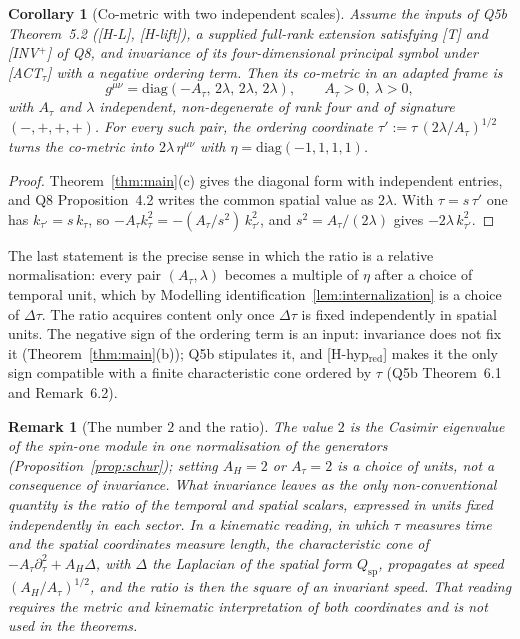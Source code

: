 \documentclass[12pt,a4paper]{article}
\newtheorem{corollary}[theorem]{Corollary}
\newtheorem{remark}[theorem]{Remark}
\newcommand{\Qsp}{Q_{\mathrm{sp}}}
\begin{document}
      \begin{corollary}[Co-metric with two independent scales]
        \label{cor:metric}
        Assume the inputs of Q5b Theorem~5.2 \textup{([H-L], [H-lift])}, a supplied full-rank extension satisfying
        \textup{[T]} and \textup{[INV$^+$]} of Q8, and invariance of its four-dimensional principal symbol under
        \textup{[ACT$_\tau$]} with a negative ordering term.
        Then its co-metric in an adapted frame is
        \[
          g^{\mu\nu} = \mathrm{diag}(-A_\tau,\, 2\lambda,\, 2\lambda,\, 2\lambda),
          \qquad A_\tau>0,\ \lambda>0,
        \]
        with $A_\tau$ and $\lambda$ independent, non-degenerate of rank four and of signature $(-,+,+,+)$.
        For every such pair, the ordering coordinate $\tau' := \tau\,(2\lambda/A_\tau)^{1/2}$ turns the co-metric into
        $2\lambda\,\eta^{\mu\nu}$ with $\eta = \mathrm{diag}(-1,1,1,1)$.
      \end{corollary}

      \begin{proof}
        Theorem~\ref{thm:main}(c) gives the diagonal form with independent entries, and Q8 Proposition~4.2 writes the
        common spatial value as $2\lambda$.
        With $\tau = s\,\tau'$ one has $k_{\tau'} = s\,k_\tau$, so $-A_\tau k_\tau^2 = -(A_\tau/s^2)\,k_{\tau'}^2$,
        and $s^2 = A_\tau/(2\lambda)$ gives $-2\lambda\,k_{\tau'}^2$.
      \end{proof}

      The last statement is the precise sense in which the ratio is a relative normalisation: every pair
      $(A_\tau,\lambda)$ becomes a multiple of $\eta$ after a choice of temporal unit, which by
      Modelling identification~\ref{lem:internalization} is a choice of $\Delta\tau$.
      The ratio acquires content only once $\Delta\tau$ is fixed independently in spatial units.
      The negative sign of the ordering term is an input: invariance does not fix it
      (Theorem~\ref{thm:main}(b)); Q5b stipulates it, and [H-hyp$_{\mathrm{red}}$] makes it the only sign compatible
      with a finite characteristic cone ordered by $\tau$ (Q5b Theorem~6.1 and Remark~6.2).

      \begin{remark}[The number $2$ and the ratio]
The value $2$ is the Casimir eigenvalue of the spin-one module in one normalisation of the generators
(Proposition~\ref{prop:schur}); setting $A_H = 2$ or $A_\tau = 2$ is a choice of units, not a consequence of invariance.
What invariance leaves as the only non-conventional quantity is the ratio of the temporal and spatial scalars,
expressed in units fixed independently in each sector.
In a kinematic reading, in which $\tau$ measures time and the spatial coordinates measure length, the characteristic
cone of $-A_\tau\partial_\tau^2 + A_H\Delta$, with $\Delta$ the Laplacian of the spatial form $\Qsp$,
propagates at speed $(A_H/A_\tau)^{1/2}$, and the ratio is then the
square of an invariant speed.
That reading requires the metric and kinematic interpretation of both coordinates and is not used in the theorems.
      \end{remark}
\end{document}
